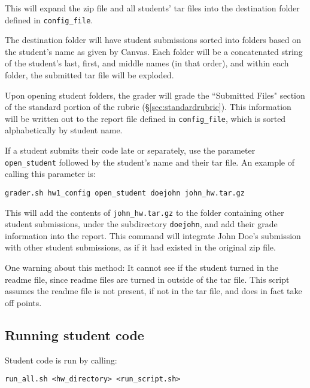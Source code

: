 \documentclass[12pt]{article}
\begin{document}
This will expand the zip file and all students' tar files into the destination folder defined in \texttt{config\_file}.

The destination folder will have student submissions sorted into folders based on the student's name as given by Canvas. Each folder will be a concatenated string of the student's last, first, and middle names (in that order), and within each folder, the submitted tar file will be exploded.

Upon opening student folders, the grader will grade the ``Submitted Files" section of the standard portion of the rubric (\S\ref{sec:standardrubric}). This information will be written out to the report file defined in \texttt{config\_file}, which is sorted alphabetically by student name.

If a student submits their code late or separately, use the parameter \texttt{open\_student} followed by the student's name and their tar file. An example of calling this parameter is:

\vspace{5pt}

\texttt{grader.sh hw1\_config open\_student doejohn john\_hw.tar.gz}

\vspace{5pt}

This will add the contents of \texttt{john\_hw.tar.gz} to the folder containing other student submissions, under the subdirectory \texttt{doejohn}, and add their grade information into the report. This command will integrate John Doe's submission with other student submissions, as if it had existed in the original zip file.

One warning about this method: It cannot see if the student turned in the readme file, since readme files are turned in outside of the tar file. This script assumes the readme file is not present, if not in the tar file, and does in fact take off points.

\vspace{5pt}

\subsection{Running student code} \label{sec:runningcode}

Student code is run by calling:

\vspace{5pt}

\noindent \texttt{run\_all.sh <hw\_directory> <run\_script.sh>}
\end{document}
